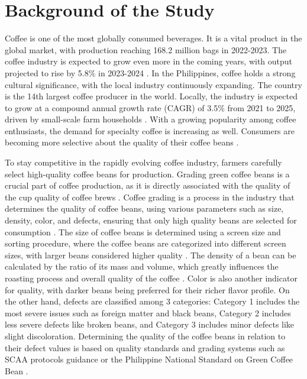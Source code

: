 \section{Background of the Study}

Coffee is one of the most globally consumed beverages. It is a vital product in the global market, with production reaching 168.2 million bags in 2022-2023. The coffee industry is expected to grow even more in the coming years, with output projected to rise by 5.8\% in 2023-2024 \cite{International_Coffee_Association_2023}. In the Philippines, coffee holds a strong cultural significance, with the local industry continuously expanding. The country is the 14th largest coffee producer in the world. Locally, the industry is expected to grow at a compound annual growth rate (CAGR) of 3.5\% from 2021 to 2025, driven by small-scale farm households \cite{Santos_Baltazar_2022}. With a growing popularity among coffee enthusiasts, the demand for specialty coffee is increasing as well. Consumers are becoming more selective about the quality of their coffee beans \cite{Tampon_2023}.  

To stay competitive in the rapidly evolving coffee industry, farmers carefully select high-quality coffee beans for production. Grading green coffee beans is a crucial part of coffee production, as it is directly associated with the quality of the cup quality of coffee brews \cite{Barbosa_Scholz_Kitzberger_Benassi_2019}. Coffee grading is a process in the industry that determines the quality of coffee beans, using various parameters such as size, density, color, and defects, ensuring that only high quality beans are selected for consumption \cite{Córdoba_Moreno_Osorio_Velásquez_Fernandez-Alduenda_Ruiz-Pardo_2021}. The size of coffee beans is determined using a screen size and sorting procedure, where the coffee beans are categorized into different screen sizes, with larger beans considered higher quality \cite{González_Lopez_Taboada_Gaytán_Ramos_2019}. The density of a bean can be calculated by the ratio of its mass and volume, which greatly influences the roasting process and overall quality of the coffee \cite{Datov_Lin_2019}. Color is also another indicator for quality, with darker beans being preferred for their richer flavor profile. On the other hand, defects are classified among 3 categories: Category 1 includes the most severe issues such as foreign matter and black beans, Category 2 includes less severe defects like broken beans, and Category 3 includes minor defects like slight discoloration. Determining the quality of the coffee beans in relation to their defect values is based on quality standards and grading systems such as SCAA protocols guidance or the Philippine National Standard on Green Coffee Bean \cite{Bureau_of_Agriculture_and_Fisheries_Standards_2012}. 

